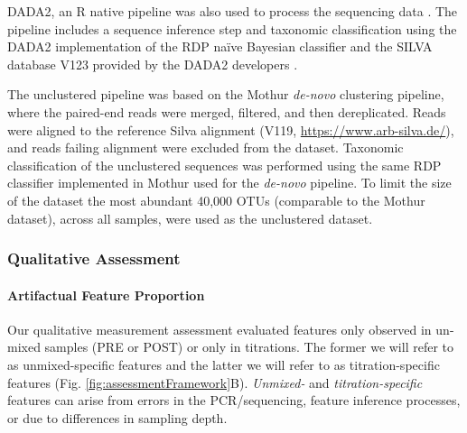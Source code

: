 \documentclass{bmcart}
\begin{document}
DADA2, an R native pipeline was also used to process the sequencing data
\cite{callahan2016dada2}. The pipeline includes a sequence inference
step and taxonomic classification using the DADA2 implementation of the
RDP naïve Bayesian classifier \cite{wang2007naive} and the SILVA
database V123 provided by the DADA2 developers
\cite[\url{https://benjjneb.github.io/dada2/training.html}]{quast2012silva}.

The unclustered pipeline was based on the Mothur \emph{de-novo}
clustering pipeline, where the paired-end reads were merged, filtered,
and then dereplicated. Reads were aligned to the reference Silva
alignment (V119, \url{https://www.arb-silva.de/}), and reads failing
alignment were excluded from the dataset. Taxonomic classification of
the unclustered sequences was performed using the same RDP classifier
implemented in Mothur used for the \emph{de-novo} pipeline. To limit the
size of the dataset the most abundant 40,000 OTUs (comparable to the
Mothur dataset), across all samples, were used as the unclustered
dataset.


\subsubsection*{Qualitative Assessment}
\paragraph*{Artifactual Feature Proportion}
Our qualitative measurement assessment evaluated features only observed in un-mixed samples (PRE or POST) or only in titrations.
The former we will refer to as unmixed-specific features and the latter we will refer to as titration-specific features (Fig. \ref{fig:assessmentFramework}B).
\emph{Unmixed-} and \emph{titration-specific} features can arise from errors in the PCR/sequencing, feature inference processes, or due to differences in sampling depth.
\end{document}
